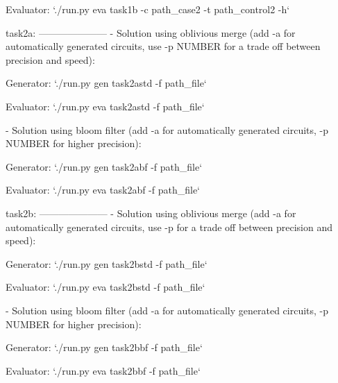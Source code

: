 \documentclass[11pt]{article}
\begin{document}
      Evaluator: `./run.py eva task1b -c path_case2 -t path_control2 -h`

task2a:
---------------------
 -  Solution using oblivious merge (add -a for automatically generated circuits, use -p NUMBER for a trade off between precision and speed):

      Generator: `./run.py gen task2astd -f path_file`

      Evaluator: `./run.py eva task2astd -f path_file`


 -  Solution using bloom filter (add -a for automatically generated circuits, -p NUMBER for higher precision):

      Generator: `./run.py gen task2abf -f path_file`

      Evaluator: `./run.py eva task2abf -f path_file`


task2b:
---------------------
 -  Solution using oblivious merge (add -a for automatically generated circuits, use -p for a trade off between precision and speed):

      Generator: `./run.py gen task2bstd -f path_file`

      Evaluator: `./run.py eva task2bstd -f path_file`


 -  Solution using bloom filter (add -a for automatically generated circuits, -p NUMBER for higher precision):

      Generator: `./run.py gen task2bbf -f path_file`

      Evaluator: `./run.py eva task2bbf -f path_file`



\end{document}
